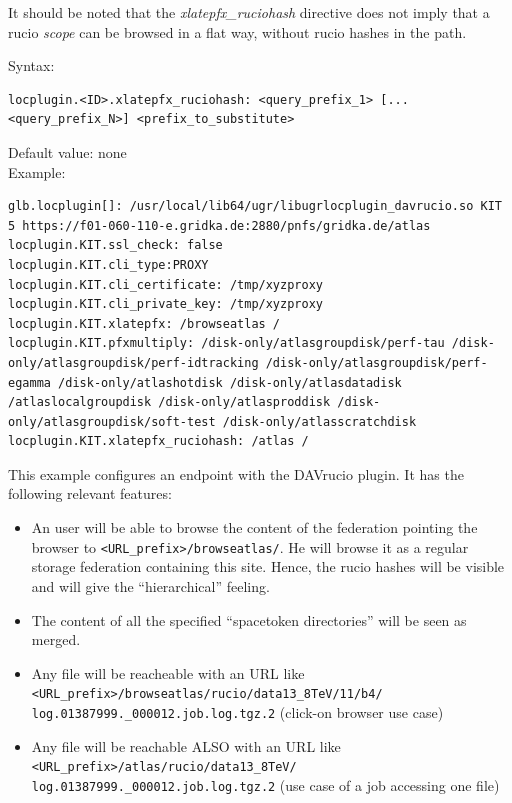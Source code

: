 \documentclass[12pt]{article} %
\begin{document}
It should be noted that the \textit{xlatepfx\_ruciohash} directive does not imply that a rucio \textit{scope} can be browsed in a flat way, without rucio hashes in the path.


Syntax:\\
\begin{lstlisting}
locplugin.<ID>.xlatepfx_ruciohash: <query_prefix_1> [... <query_prefix_N>] <prefix_to_substitute>
\end{lstlisting}

Default value: none\\

Example:\\
\begin{lstlisting}
glb.locplugin[]: /usr/local/lib64/ugr/libugrlocplugin_davrucio.so KIT 5 https://f01-060-110-e.gridka.de:2880/pnfs/gridka.de/atlas
locplugin.KIT.ssl_check: false
locplugin.KIT.cli_type:PROXY
locplugin.KIT.cli_certificate: /tmp/xyzproxy
locplugin.KIT.cli_private_key: /tmp/xyzproxy
locplugin.KIT.xlatepfx: /browseatlas /
locplugin.KIT.pfxmultiply: /disk-only/atlasgroupdisk/perf-tau /disk-only/atlasgroupdisk/perf-idtracking /disk-only/atlasgroupdisk/perf-egamma /disk-only/atlashotdisk /disk-only/atlasdatadisk /atlaslocalgroupdisk /disk-only/atlasproddisk /disk-only/atlasgroupdisk/soft-test /disk-only/atlasscratchdisk
locplugin.KIT.xlatepfx_ruciohash: /atlas /
\end{lstlisting}

This example configures an endpoint with the DAVrucio plugin. It has the following relevant features:

\begin{itemize}
 \item An user will be able to browse the content of the federation pointing the browser to \lstinline{<URL_prefix>/browseatlas/}. He will browse it as a regular storage federation containing this site. Hence, the rucio hashes will be visible and will give the ``hierarchical'' feeling.
 \item The content of all the specified ``spacetoken directories'' will be seen as merged.
 \item Any file will be reacheable with an URL like \\
       \lstinline{<URL_prefix>/browseatlas/rucio/data13_8TeV/11/b4/}\\
       \lstinline{log.01387999._000012.job.log.tgz.2} (click-on browser use case)
 \item Any file will be reachable ALSO with an URL like \\
       \lstinline{<URL_prefix>/atlas/rucio/data13_8TeV/}\\
       \lstinline{log.01387999._000012.job.log.tgz.2} (use case of a job accessing one file)
\end{itemize}
\end{document}
